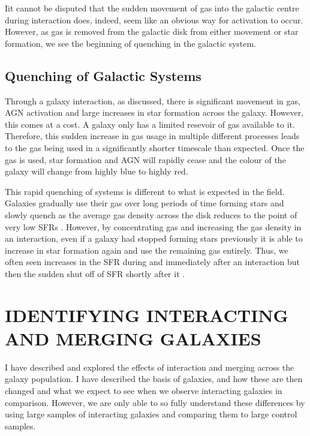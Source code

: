 Iit cannot be disputed that the sudden movement of gas into the galactic centre during interaction does, indeed, seem like an obvious way for activation to occur. However, as gas is removed from the galactic disk from either movement or star formation, we see the beginning of quenching in the galactic system. 

\subsection{Quenching of Galactic Systems}
\noindent Through a galaxy interaction, as discussed, there is significant movement in gas, AGN activation and large increases in star formation across the galaxy. However, this comes at a cost. A galaxy only has a limited resevoir of gas available to it. Therefore, this sudden increase in gas usage in multiple different processes leads to the gas being used in a significantly shorter timescale than expected. Once the gas is used, star formation and AGN will rapidly cease and the colour of the galaxy will change from highly blue to highly red. 

This rapid quenching of systems is different to what is expected in the field. Galaxies gradually use their gas over long periods of time forming stars and slowly quench as the average gas density across the disk reduces to the point of very low SFRs \citep{papers on regular quenching}. However, by concentrating gas and increasing the gas density in an interaction, even if a galaxy had stopped forming stars previously it is able to increase in star formation again and use the remaining gas entirely. Thus, we often seen increases in the SFR during and immediately after an interaction but then the sudden shut off of SFR shortly after it \citep{Paper on sudden shut down of SFR by interaction}.

\section{IDENTIFYING INTERACTING AND MERGING GALAXIES}
\noindent I have described and explored the effects of interaction and merging across the galaxy population. I have described the basis of galaxies, and how these are then changed and what we expect to see when we observe interacting galaxies in comparison. However, we are only able to so fully understand these differences by using large samples of interacting galaxies and comparing them to large control samples.

